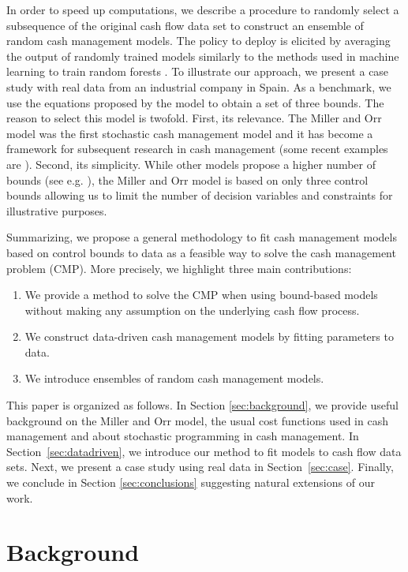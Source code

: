 In order to speed up computations, we describe a procedure to randomly select a subsequence of the original cash flow data set to construct an ensemble of random cash management models. The policy to deploy is elicited by averaging the output of randomly trained models similarly to the methods used in machine learning to train random forests \citep{ho1998random,breiman2001random}. To illustrate our approach, we present a case study with real data from an industrial company in Spain. As a benchmark, we use the equations proposed by the \cite{miller1966model} model to obtain a set of three bounds. The reason to select this model is twofold. First, its relevance. The Miller and Orr model was the first stochastic cash management model and it has become a framework for subsequent research in cash management (some recent examples are \cite{premachandra2004diffusion,da2014evolutionary}). Second, its simplicity. While other models propose a higher number of bounds (see e.g. \cite{eppen1969cash,stone1972use}), the Miller and Orr model is based on only three control bounds allowing us to limit the number of decision variables and constraints for illustrative purposes.

Summarizing, we propose a general methodology to fit cash management models based on control bounds to data as a feasible way to solve the cash management problem (CMP). More precisely, we highlight three main contributions:
\begin{enumerate}
\item We provide a method to solve the CMP when using bound-based models without making any assumption on the underlying cash flow process.
\item We construct data-driven cash management models by fitting parameters to data.
\item We introduce ensembles of random cash management models.
\end{enumerate}

This paper is organized as follows. In Section \ref{sec:background}, we provide useful background on the Miller and Orr model, the usual cost functions used in cash management and about stochastic programming in cash management. In Section~\ref{sec:datadriven}, we introduce our method to fit models to cash flow data sets. Next, we present a case study using real data in Section~\ref{sec:case}. Finally, we conclude in Section \ref{sec:conclusions} suggesting natural extensions of our work.

\section{Background\label{sec:background}}

